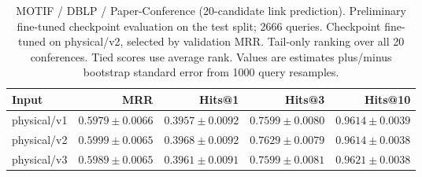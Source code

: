 \begin{table}[t]
\centering
\small
\begin{tabular}{lrrrr}
\toprule
Input & MRR & Hits@1 & Hits@3 & Hits@10 \\
\midrule
physical/v1 & $0.5979 \pm 0.0066$ & $0.3957 \pm 0.0092$ & $0.7599 \pm 0.0080$ & $0.9614 \pm 0.0039$ \\
physical/v2 & $0.5999 \pm 0.0065$ & $0.3968 \pm 0.0092$ & $0.7629 \pm 0.0079$ & $0.9614 \pm 0.0038$ \\
physical/v3 & $0.5989 \pm 0.0065$ & $0.3961 \pm 0.0091$ & $0.7599 \pm 0.0081$ & $0.9621 \pm 0.0038$ \\
\bottomrule
\end{tabular}
\caption{MOTIF / DBLP / Paper-Conference (20-candidate link prediction). Preliminary fine-tuned checkpoint evaluation on the test split; 2666 queries. Checkpoint fine-tuned on physical/v2, selected by validation MRR. Tail-only ranking over all 20 conferences. Tied scores use average rank. Values are estimates plus/minus bootstrap standard error from 1000 query resamples.}
\label{tab:motif-paper_conference-link_prediction}
\end{table}
